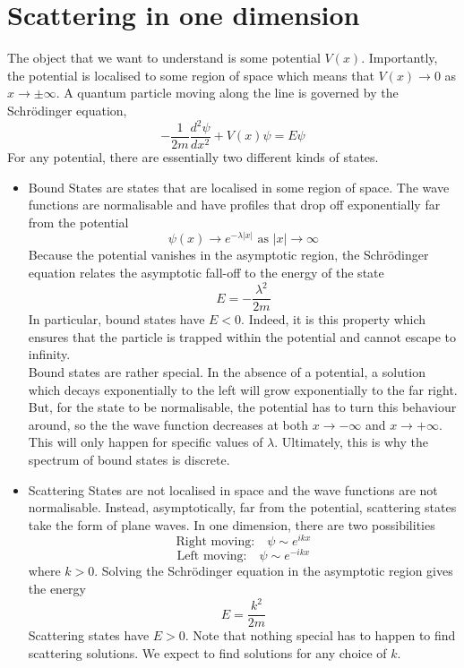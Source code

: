 \section{Scattering in one dimension}
The object that we want to understand is some potential $V(x)$. Importantly, the potential is localised to some
region of space which means that $V (x) \to 0$ as $x \to \pm \infty$.
A quantum particle moving along the line is governed by the Schrödinger equation,
\[-\frac{1}{2m}\frac{d^2\psi}{dx^2} + V(x)\psi = E\psi\]
For any potential, there are essentially two different kinds of states.
\begin{itemize}
\item Bound States are states that are localised in some region of space. The wave functions are normalisable and have profiles that drop off exponentially far from the
potential 
\[\psi(x) \to e^{-\lambda|x|} \mbox{ as } |x| \to \infty\]
Because the potential vanishes in the asymptotic region, the Schrödinger equation relates the asymptotic fall-off to the energy of the state
\[E = -\frac{\lambda^2}{2m}\]
In particular, bound states have $E < 0$. Indeed, it is this property which ensures that the particle is trapped within the potential and cannot escape to infinity.
\\
Bound states are rather special. In the absence of a potential, a solution which decays exponentially to the left will grow exponentially to the far right. 
But, for the state to be normalisable, the potential has to turn this behaviour around, so the the wave function decreases at both $x \to -\infty$ and $x \to +\infty$. 
This will only happen for specific values of $\lambda$. Ultimately, this is why the spectrum of bound states is discrete.
\item Scattering States are not localised in space and the wave functions are not normalisable. 
Instead, asymptotically, far from the potential, scattering states take the form of plane waves. In one dimension, there are two possibilities
\[\mbox{Right moving:} \quad \psi \sim e^{ikx}\]
\[\mbox{Left moving:} \quad \psi \sim e^{-ikx}\]
where $k > 0$. Solving the Schrödinger equation in the asymptotic region gives the energy
\[E = \frac{k^2}{2m}\]
Scattering states have $E > 0$. Note that nothing special has to happen to find scattering solutions. We expect to find solutions for any choice of $k$.
\end{itemize}

